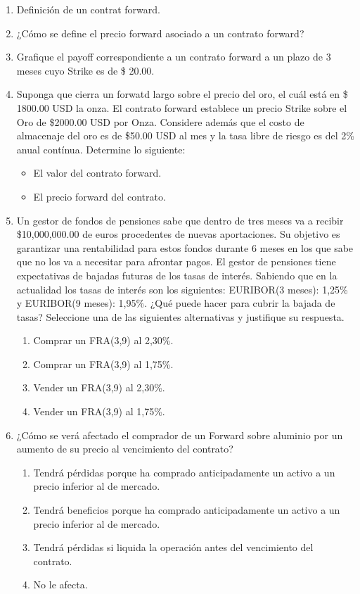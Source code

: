 \documentclass{article}
\begin{document}
\begin{enumerate}
\item Definición de un contrat forward.
\item ¿Cómo se define el precio forward asociado a un contrato forward?
\item Grafique el payoff correspondiente a un contrato forward a un plazo de 3 meses cuyo Strike es de \$ 20.00.
\item Suponga que cierra un forwatd largo sobre el precio del oro, el cuál está en \$ 1800.00 USD la onza. El 
    contrato forward establece un precio Strike sobre el Oro de \$2000.00 USD por Onza. Considere además
    que el costo de almacenaje del oro es de \$50.00 USD al mes y la tasa libre de riesgo es del 2\% anual contínua.
    Determine lo siguiente:
    \begin{itemize}
        \item El valor del contrato forward.
        \item El precio forward del contrato.
    \end{itemize}

\item Un gestor de fondos de pensiones sabe que dentro de tres meses va a
recibir \$10,000,000.00 de euros procedentes de nuevas aportaciones. Su
objetivo es garantizar una rentabilidad para estos fondos durante 6 meses
en los que sabe que no los va a necesitar para afrontar pagos. El gestor de
pensiones tiene expectativas de bajadas futuras de los tasas de interés.
Sabiendo que en la actualidad los tasas de interés son los siguientes:
EURIBOR(3 meses): 1,25\% y EURIBOR(9 meses): 1,95\%. ¿Qué puede
hacer para cubrir la bajada de tasas? Seleccione una de las siguientes
 alternativas y justifique su respuesta.

\begin{enumerate}
    \item Comprar un FRA(3,9) al 2,30\%.
    \item Comprar un FRA(3,9) al 1,75\%.
    \item Vender un FRA(3,9) al 2,30\%.
    \item Vender un FRA(3,9) al 1,75\%.
\end{enumerate}

\item ¿Cómo se verá afectado el comprador de un Forward sobre aluminio por
un aumento de su precio al vencimiento del contrato?

\begin{enumerate}
    \item Tendrá pérdidas porque ha comprado anticipadamente un activo a un
    precio inferior al de mercado.
    \item Tendrá beneficios porque ha comprado anticipadamente un activo a un
    precio inferior al de mercado.
    \item Tendrá pérdidas si liquida la operación antes del vencimiento del
    contrato.
    \item No le afecta.
\end{enumerate}


\end{enumerate}
\end{document}
